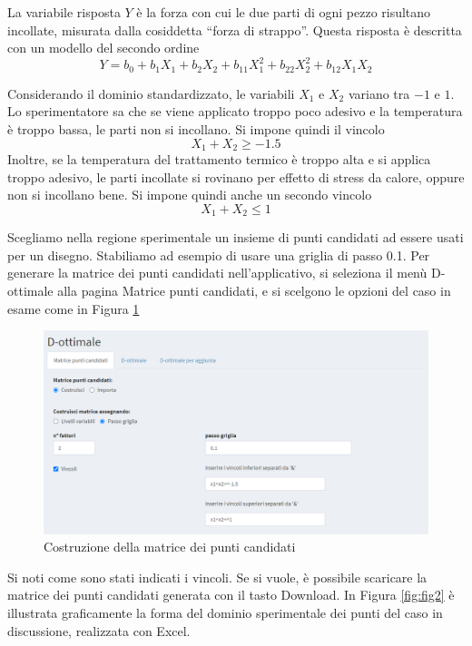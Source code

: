 \documentclass[
  11pt,
]{book}
\begin{document}
La variabile risposta \(Y\) è la forza con cui le due parti di ogni pezzo risultano incollate, misurata dalla cosiddetta ``forza di strappo''. Questa risposta è descritta con un modello del secondo ordine
\[
Y=b_0+b_1X_1+b_2X_2+b_{11}X_1^2+b_{22}X_2^2+b_{12}X_1X_2
\]

Considerando il dominio standardizzato, le variabili \(X_1\) e \(X_2\) variano tra \(-1\) e \(1\). Lo sperimentatore sa che se viene applicato troppo poco adesivo e la temperatura è troppo bassa, le parti non si incollano. Si impone quindi il vincolo
\[
X_1+X_2\geq-1.5
\]
Inoltre, se la temperatura del trattamento termico è troppo alta e si applica troppo adesivo, le parti incollate si rovinano per effetto di stress da calore, oppure non si incollano bene. Si impone quindi anche un secondo vincolo
\[
X_1+X_2\leq 1
\]

Scegliamo nella regione sperimentale un insieme di punti candidati ad essere usati per un disegno. Stabiliamo ad esempio di usare una griglia di passo 0.1. Per generare la matrice dei punti candidati nell'applicativo, si seleziona il menù D-ottimale alla pagina Matrice punti candidati, e si scelgono le opzioni del caso in esame come in Figura \ref{fig:fig1}

\begin{figure}[ht]

{\centering \includegraphics[width=1\linewidth]{Immagini/D_opt/01_es1_pticandidati} 

}

\caption{Costruzione della matrice dei punti candidati}\label{fig:fig1}
\end{figure}

Si noti come sono stati indicati i vincoli. Se si vuole, è possibile scaricare la matrice dei punti candidati generata con il tasto Download. In Figura \ref{fig:fig2} è illustrata graficamente la forma del dominio sperimentale dei punti del caso in discussione, realizzata con Excel.
\end{document}
